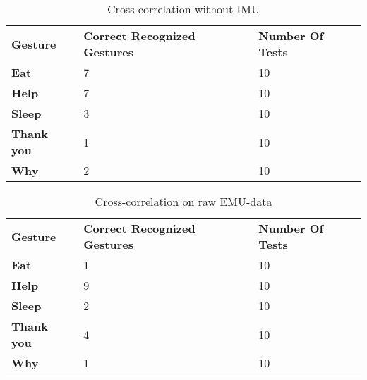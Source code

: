 \begin{table}[ht!]
\centering
    \begin{tabular}{ | l | p{4cm} | p{4cm}|}
        \hline
        \textbf{Gesture} & \textbf{Correct Recognized Gestures} & \textbf{Number Of Tests} \\ \Xhline{4\arrayrulewidth}
        
        \textbf{Eat} & 7 &  10 \\ \hline
        
        \textbf{Help}  & 7 &  10 \\ \hline
        
        \textbf{Sleep}  & 3 &  10 \\ \hline
        
        \textbf{Thank you}  & 1 &  10 \\ \hline
        
        \textbf{Why}  & 2 &  10 \\ \hline
    \end{tabular}
    \caption[Cross-correlation without IMU]{Cross-correlation without IMU}
    \label{table:cross_correlation_without_IMU_test}
\end{table}

\begin{table}[ht!]
\centering
    \begin{tabular}{ | l | p{4cm} | p{4cm}|}
        \hline
        \textbf{Gesture} & \textbf{Correct Recognized Gestures} & \textbf{Number Of Tests} \\ \Xhline{4\arrayrulewidth}
        
        \textbf{Eat} & 1 &  10 \\ \hline
        
        \textbf{Help}  & 9 &  10 \\ \hline
        
        \textbf{Sleep}  & 2 &  10 \\ \hline
        
        \textbf{Thank you}  & 4 &  10 \\ \hline
        
        \textbf{Why}  & 1 &  10 \\ \hline
    \end{tabular}
    \caption[Cross-correlation on raw EMU]{Cross-correlation on raw EMU-data}
    \label{table:cross_correlation_raw_EMG_test}
\end{table}
